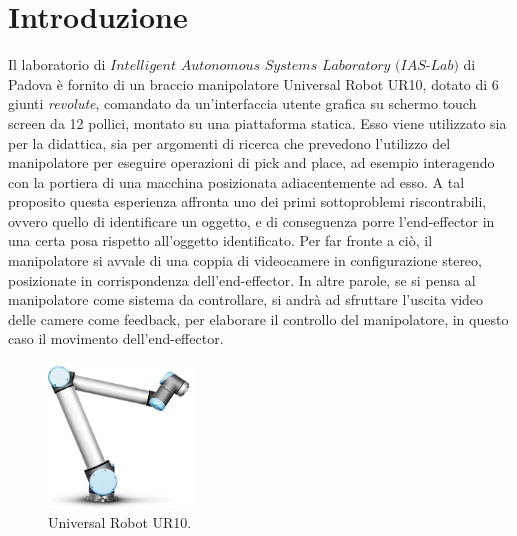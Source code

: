 \documentclass[english]{article}
\begin{document}
\tableofcontents
\newpage

\section{Introduzione} 
Il laboratorio di $Intelligent$ $Autonomous$ $Systems$ $Laboratory$ $(IAS$-$Lab)$ di Padova è fornito di un braccio manipolatore Universal Robot UR10, dotato di 6 giunti \textit{revolute}, comandato da un'interfaccia utente grafica su schermo touch screen da 12 pollici, montato su una piattaforma statica. Esso viene utilizzato sia per la didattica, sia per argomenti di ricerca che prevedono l'utilizzo del manipolatore per eseguire operazioni di pick and place, ad esempio interagendo con la portiera di una macchina posizionata adiacentemente ad esso. A tal proposito questa esperienza affronta uno dei primi sottoproblemi riscontrabili, ovvero quello di identificare un oggetto, e di conseguenza porre l'end-effector in una certa posa rispetto all'oggetto identificato. Per far fronte a ciò, il manipolatore si avvale di una coppia di videocamere in configurazione stereo, posizionate in corrispondenza dell'end-effector. In altre parole, se si pensa al manipolatore come sistema da controllare, si andrà ad sfruttare l'uscita video delle camere come feedback, per elaborare il controllo del manipolatore, in questo caso il movimento dell'end-effector. 


\begin{figure}[!h]
\centering
\includegraphics[width=0.35\textwidth]{ur10}
\caption{Universal Robot UR10.}
\label{fig:ur10}
\end{figure}
\end{document}
